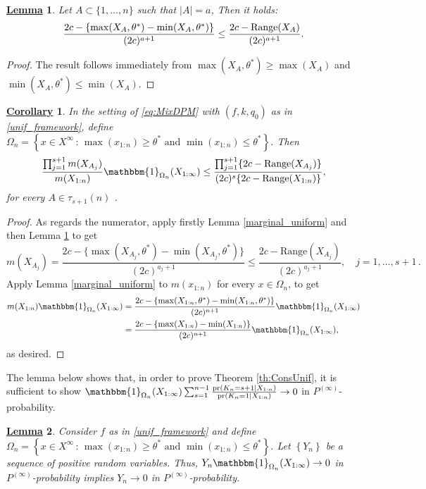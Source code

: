 \documentclass[12pt]{article}
\newtheorem{Lem}{\underline{\bf Lemma}}
\newtheorem{Cor}{\underline{\bf Corollary}}
\begin{document}
\begin{Lem}\label{lemma_unif2}
Let $A \subset \{1, \dots, n\}$ such that $|A| = a$, Then it holds:
\[
\frac{2c- \{\max(X_{A},\theta^\ast)-\min(X_{A},\theta^\ast)\}}{(2c)^{a+1}} \le  \frac{2c-\text{\rm Range}(X_{A})}{(2c)^{a+1}}.
\]
\end{Lem}
\begin{proof}
The result follows immediately from $\max(X_{A},\theta^\ast) \geq \max(X_{A})$ and $\min(X_{A},\theta^\ast) \leq \min(X_{A})$.
\end{proof}
\begin{Cor}\label{main_cor}
In the setting of \eqref{eq:MixDPM} with $(f, k, q_0)$ as in \eqref{unif_framework}, define\\
 $\Omega_n = \left\{ x \in X^{\infty} \, : \,   \max (x_{1:n}) \geq  \theta^\ast \text{ and } \min (x_{1:n} ) \leq \theta^\ast \right\}$. Then
\begin{align}\label{eq:m_ratio_Unif_s+1}
\frac{\prod_{j=1}^{s+1} m(X_{A_j})}{m(X_{1:n})} \mathbbm{1}_{\Omega_n}(X_{1:\infty}) \le \frac{\prod_{j=1}^{s+1} \{2c-\text{\rm Range}(X_{A_j})\}}{(2c)^s \{ 2c-\text{\rm Range}(X_{1:n})\}},
\end{align}
for every $A \in \tau_{s+1}(n)$ .
\end{Cor}
\begin{proof}
As regards the numerator, apply firstly Lemma \ref{marginal_uniform} and then Lemma \ref{lemma_unif2} to get
\[
m(X_{A_j}) = \frac{2c- \{\max(X_{A_j},\theta^\ast)-\min(X_{A_j},\theta^\ast)\}}{(2c)^{a_j+1}} \leq \frac{2c-\text{Range}(X_{A_j})}{(2c)^{a_j+1}}, \quad j = 1, \dots, s+1\,.
\]
Apply Lemma \ref{marginal_uniform} to $m(x_{1:n})$ for every $x \in \Omega_n$, to get
\[
\begin{aligned}
m(X_{1:n})\mathbbm{1}_{\Omega_n}(X_{1:\infty}) &=\frac{2c- \{\max(X_{1:n},\theta^\ast)-\min(X_{1:n},\theta^\ast)\}}{(2c)^{n+1}}\mathbbm{1}_{\Omega_n}(X_{1:\infty}) \\
&= \frac{2c- \{\max(X_{1:n})-\min(X_{1:n})\}}{(2c)^{n+1}}\mathbbm{1}_{\Omega_n}(X_{1:\infty}), 
\end{aligned}
\]
as desired.
\end{proof}
The lemma below shows that, in order to prove Theorem \ref{th:ConsUnif}, it is sufficient to show $\mathbbm{1}_{\Omega_n}(X_{1:\infty})\sum_{s = 1}^{n-1}\frac{\text{pr}(K_n = s+1 | X_{1:n})}{\text{pr}(K_n = 1 | X_{1:n})} \to 0$ in $P^{(\infty)}$-probability.
\begin{Lem}\label{lemma_unif_tech}
Consider $f$ as in \eqref{unif_framework} and define $\Omega_n = \left\{ x \in X^{\infty} \, : \,   \max (x_{1:n}) \geq  \theta^\ast \text{ and } \min (x_{1:n} ) \leq \theta^\ast \right\}$. Let $\left\{Y_n\right\}$ be a sequence of positive random variables. Thus, $Y_n\mathbbm{1}_{\Omega_n}(X_{1:\infty}) \to 0$ in $P^{(\infty)}$-probability implies $Y_n \to 0$ in $P^{(\infty)}$-probability.
\end{Lem}
\end{document}

